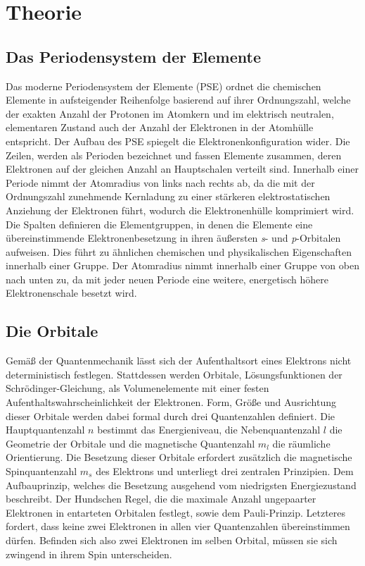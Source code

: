 \section{Theorie}

\subsection{Das Periodensystem der Elemente}
Das moderne Periodensystem der Elemente (PSE) ordnet die chemischen Elemente in aufsteigender Reihenfolge basierend auf ihrer Ordnungszahl, welche der exakten Anzahl der Protonen im Atomkern und im elektrisch neutralen, elementaren Zustand auch der Anzahl der Elektronen in der Atomhülle entspricht. Der Aufbau des PSE spiegelt die Elektronenkonfiguration wider. Die Zeilen, werden als Perioden bezeichnet und fassen Elemente zusammen, deren Elektronen auf der gleichen Anzahl an Hauptschalen verteilt sind. Innerhalb einer Periode nimmt der Atomradius von links nach rechts ab, da die mit der Ordnungszahl zunehmende Kernladung zu einer stärkeren elektrostatischen Anziehung der Elektronen führt, wodurch die Elektronenhülle komprimiert wird. Die Spalten definieren die Elementgruppen, in denen die Elemente eine übereinstimmende Elektronenbesetzung in ihren äußersten \textit{s}- und \textit{p}-Orbitalen aufweisen. Dies führt zu ähnlichen chemischen und physikalischen Eigenschaften innerhalb einer Gruppe. Der Atomradius nimmt innerhalb einer Gruppe von oben nach unten zu, da mit jeder neuen Periode eine weitere, energetisch höhere Elektronenschale besetzt wird. \cite{skript}

\subsection{Die Orbitale}
Gemäß der Quantenmechanik lässt sich der Aufenthaltsort eines Elektrons nicht deterministisch festlegen. Stattdessen werden Orbitale, Lösungsfunktionen der Schrödinger-Gleichung, als Volumenelemente mit einer festen Aufenthaltswahrscheinlichkeit der Elektronen. Form, Größe und Ausrichtung dieser Orbitale werden dabei formal durch drei Quantenzahlen definiert. Die Hauptquantenzahl $n$ bestimmt das Energieniveau, die Nebenquantenzahl $l$ die Geometrie der Orbitale und die magnetische Quantenzahl $m_l$ die räumliche Orientierung. Die Besetzung dieser Orbitale erfordert zusätzlich die magnetische Spinquantenzahl $m_s$ des Elektrons und unterliegt drei zentralen Prinzipien. Dem Aufbauprinzip, welches die Besetzung ausgehend vom niedrigsten Energiezustand beschreibt. Der Hundschen Regel, die die maximale Anzahl ungepaarter Elektronen in entarteten Orbitalen festlegt, sowie dem Pauli-Prinzip. Letzteres fordert, dass keine zwei Elektronen in allen vier Quantenzahlen übereinstimmen dürfen. Befinden sich also zwei Elektronen im selben Orbital, müssen sie sich zwingend in ihrem Spin unterscheiden. \cite{skript}\newline

